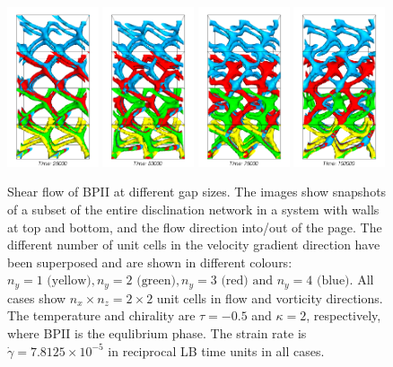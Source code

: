 \documentclass[12pt,twoside]{iopart}
\newcommand{\ex}[1]{\times10^{#1}}
\begin{document}
\begin{figure}[t]
\includegraphics[width=0.24\textwidth]{bp2_t-0o5_k2_25k_y.png}
\includegraphics[width=0.24\textwidth]{bp2_t-0o5_k2_50k_y.png}
\includegraphics[width=0.24\textwidth]{bp2_t-0o5_k2_75k_y.png}
\includegraphics[width=0.24\textwidth]{bp2_t-0o5_k2_100k_y.png}
\caption{Shear flow of BPII at different gap sizes. The images show
snapshots of a subset of the entire disclination network in a system
with walls at top and bottom, and the flow direction into/out of the
page. The different number of unit cells in the velocity gradient
direction have been superposed and are shown in different colours:
$n_y=1 \mbox{ (yellow)}, n_y=2 \mbox{ (green)}, n_y=3 \mbox{ (red) and }
n_y=4 \mbox{ (blue)}$. All cases show $n_x \times n_z =2 \times 2$ unit
cells in flow and vorticity directions. The temperature and chirality are
$\tau=-0.5$ and $\kappa=2$, respectively, where BPII is the equlibrium phase.
The strain rate is $\dot{\gamma}=7.8125\ex{-5}$ in reciprocal LB time units in all cases.}
\label{fig1}
\end{figure}
\end{document}
